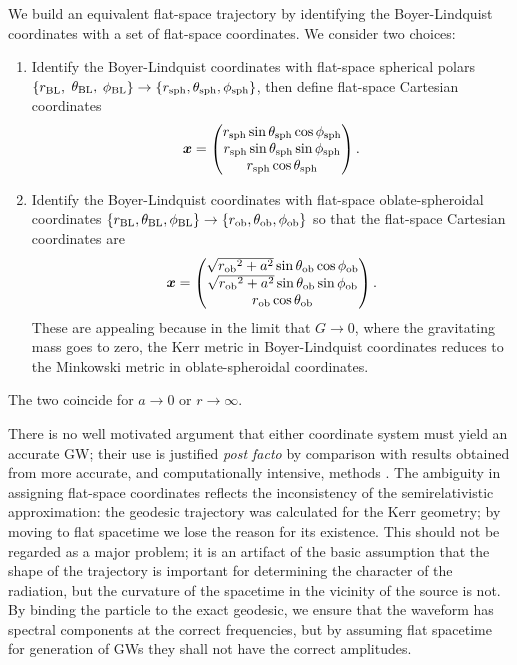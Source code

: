 We build an equivalent flat-space trajectory by identifying the Boyer-Lindquist coordinates with a set of flat-space coordinates. We consider two choices:
\begin{enumerate}
\item Identify the Boyer-Lindquist coordinates with flat-space spherical polars $\{r_\mathrm{BL},$ $\theta_\mathrm{BL},$ $\phi_\mathrm{BL}\} \rightarrow \{r_\mathrm{sph}, \theta_\mathrm{sph}, \phi_\mathrm{sph}\}$, then define flat-space Cartesian coordinates \citep{Gair2005, Babak2007}
\begin{equation}
\boldsymbol{x} = \begin{pmatrix}
r_\mathrm{sph} \sin\theta_\mathrm{sph}\cos\phi_\mathrm{sph} \\
r_\mathrm{sph} \sin\theta_\mathrm{sph}\sin\phi_\mathrm{sph} \\
r_\mathrm{sph} \cos\theta_\mathrm{sph}
\end{pmatrix}.
\end{equation}
\item Identify the Boyer-Lindquist coordinates with flat-space oblate-spheroidal coordinates $\{r_\mathrm{BL}, \theta_\mathrm{BL}, \phi_\mathrm{BL}\} \rightarrow \{r_\mathrm{ob}, \theta_\mathrm{ob}, \phi_\mathrm{ob}\}$ so that the flat-space Cartesian coordinates are
\begin{equation}
\boldsymbol{x} = \begin{pmatrix}
\sqrt{{r_\mathrm{ob}}^2 + a^2} \sin\theta_\mathrm{ob}\cos\phi_\mathrm{ob} \\
\sqrt{{r_\mathrm{ob}}^2 + a^2} \sin\theta_\mathrm{ob}\sin\phi_\mathrm{ob} \\
r_\mathrm{ob} \cos\theta_\mathrm{ob}
\end{pmatrix}.
\end{equation}
These are appealing because in the limit that $G \rightarrow 0$, where the gravitating mass goes to zero, the Kerr metric in Boyer-Lindquist coordinates reduces to the Minkowski metric in oblate-spheroidal coordinates.
\end{enumerate}
The two coincide for $a \rightarrow 0$ or $r \rightarrow \infty$.

There is no well motivated argument that either coordinate system must yield an accurate GW; their use is justified {\it post facto} by comparison with results obtained from more accurate, and computationally intensive, methods \citep{Gair2005, Babak2007}. The ambiguity in assigning flat-space coordinates reflects the inconsistency of the semirelativistic approximation: the geodesic trajectory was calculated for the Kerr geometry; by moving to flat spacetime we lose the reason for its existence. This should not be regarded as a major problem; it is an artifact of the basic assumption that the shape of the trajectory is important for determining the character of the radiation, but the curvature of the spacetime in the vicinity of the source is not. By binding the particle to the exact geodesic, we ensure that the waveform has spectral components at the correct frequencies, but by assuming flat spacetime for generation of GWs they shall not have the correct amplitudes.

